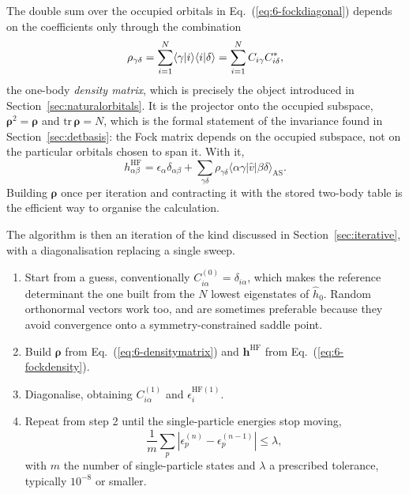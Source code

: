 The double sum over the occupied orbitals in Eq.~(\ref{eq:6-fockdiagonal})
depends on the coefficients only through the combination
\begin{equation}
  \rho_{\gamma\delta}
  = \sum_{i=1}^{N}\langle \gamma \vert i \rangle\langle i \vert \delta \rangle
  = \sum_{i=1}^{N}C_{i\gamma}C^{*}_{i\delta},
  \label{eq:6-densitymatrix}
\end{equation}
the one-body \emph{density matrix}, which is precisely the object introduced
in Section~\ref{sec:naturalorbitals}.  It is the projector onto the occupied
subspace, $\bm{\rho}^2=\bm{\rho}$ and $\mathrm{tr}\,\bm{\rho}=N$, which is the
formal statement of the invariance found in Section~\ref{sec:detbasis}: the
Fock matrix depends on the occupied subspace, not on the particular orbitals
chosen to span it.  With it,
\begin{equation}
  h^{\mathrm{HF}}_{\alpha\beta}
  = \epsilon_{\alpha}\delta_{\alpha\beta}
  + \sum_{\gamma\delta}\rho_{\gamma\delta}
    \langle\alpha\gamma\vert\hat{v}\vert\beta\delta\rangle_{\mathrm{AS}} .
  \label{eq:6-fockdensity}
\end{equation}
Building $\bm{\rho}$ once per iteration and contracting it with the stored
two-body table is the efficient way to organise the calculation.

The algorithm is then an iteration of the kind discussed in
Section~\ref{sec:iterative}, with a diagonalisation replacing a single sweep.

\begin{enumerate}
  \item Start from a guess, conventionally $C^{(0)}_{i\alpha}
    =\delta_{i\alpha}$, which makes the reference determinant the one built
    from the $N$ lowest eigenstates of $\hat{h}_0$.  Random orthonormal
    vectors work too, and are sometimes preferable because they avoid
    convergence onto a symmetry-constrained saddle point.
  \item Build $\bm{\rho}$ from Eq.~(\ref{eq:6-densitymatrix}) and
    $\bm{h}^{\mathrm{HF}}$ from Eq.~(\ref{eq:6-fockdensity}).
  \item Diagonalise, obtaining $C^{(1)}_{i\alpha}$ and
    $\epsilon_i^{\mathrm{HF}(1)}$.
  \item Repeat from step 2 until the single-particle energies stop moving,
    \begin{equation}
      \frac{1}{m}\sum_{p}\left\vert
        \epsilon_p^{(n)}-\epsilon_p^{(n-1)}\right\vert \le \lambda,
      \label{eq:6-convergence}
    \end{equation}
    with $m$ the number of single-particle states and $\lambda$ a prescribed
    tolerance, typically $10^{-8}$ or smaller.
\end{enumerate}

